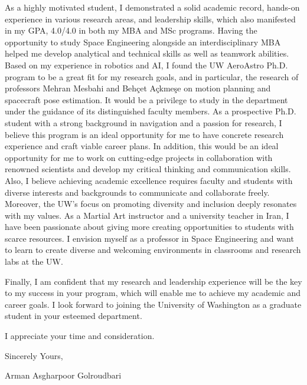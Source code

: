 \documentclass[a4,25pt]{article}
\begin{document}
\begin{large}
\vspace{-0.35cm} \quad As a highly motivated student, I demonstrated a solid academic record, hands-on experience in various research areas, and leadership skills, which also manifested in my GPA, 4.0/4.0 in both my MBA and MSc programs. Having the opportunity to study Space Engineering alongside an interdisciplinary MBA helped me develop analytical and technical skills as well as teamwork abilities. Based on my experience in robotics and AI, I found the UW AeroAstro Ph.D. program to be a great fit for my research goals, and in particular, the research of professors Mehran Mesbahi and Behçet Açkmeşe on motion planning and spacecraft pose estimation. It would be a privilege to study in the department under the guidance of its distinguished faculty members. As a prospective Ph.D. student with a strong background in navigation and a passion for research, I believe this program is an ideal opportunity for me to have concrete research experience and craft viable career plans. In addition, this would be an ideal opportunity for me to work on cutting-edge projects in collaboration with renowned scientists and develop my critical thinking and communication skills. Also, I believe  achieving academic excellence requires faculty and students with diverse interests and backgrounds to communicate and collaborate freely. Moreover, the UW's focus on promoting diversity and inclusion deeply resonates with my values. As a Martial Art instructor and a university teacher in Iran, I have been passionate about giving more creating opportunities to students with scarce resources. I envision myself as a professor in Space Engineering and want to learn to create diverse and welcoming environments in classrooms and research labs at the UW. \par
\vspace{-0.35cm} \quad Finally, I am confident that my research and leadership experience will be the key to my success in your program, which will enable me to achieve my academic and career goals. I look forward to joining the University of Washington as a graduate student in your esteemed department. \par
\vspace{-0.35cm}I appreciate your time and consideration. \par
\vspace{-0.4cm}Sincerely Yours, \par
\vspace{-0.4cm}Arman Asgharpoor Golroudbari \par
\end{large}
\end{document}
